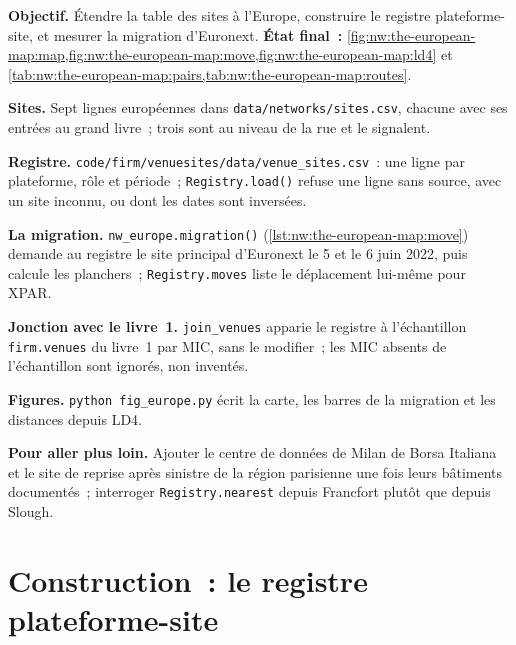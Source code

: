 \begin{tutorial}
\textbf{Objectif.} Étendre la table des sites à l'Europe, construire le registre plateforme-site, et mesurer la migration d'Euronext.
\textbf{État final~:} \cref{fig:nw:the-european-map:map,fig:nw:the-european-map:move,fig:nw:the-european-map:ld4} et
\cref{tab:nw:the-european-map:pairs,tab:nw:the-european-map:routes}.
\begin{tutsteps}
\item \textbf{Sites.} Sept lignes européennes dans \texttt{data/networks/sites.csv}, chacune avec ses entrées au grand livre~; trois sont au niveau de la rue et le signalent.
\item \textbf{Registre.} \texttt{code/firm/venuesites/data/venue\_sites.csv}~: une ligne par plateforme, rôle et période~;
  \texttt{Registry.load()} refuse une ligne sans source, avec un site inconnu, ou dont les dates sont inversées.
\item \textbf{La migration.} \texttt{nw\_europe.migration()} (\cref{lst:nw:the-european-map:move}) demande au registre le site principal d'Euronext
  le 5 et le 6 juin 2022, puis calcule les planchers~; \texttt{Registry.moves} liste le déplacement lui-même pour XPAR.
\item \textbf{Jonction avec le livre~1.} \texttt{join\_venues} apparie le registre à l'échantillon \texttt{firm.venues} du livre~1 par MIC, sans
  le modifier~; les MIC absents de l'échantillon sont ignorés, non inventés.
\item \textbf{Figures.} \texttt{python fig\_europe.py} écrit la carte, les barres de la migration et les distances depuis LD4.
\end{tutsteps}
\textbf{Pour aller plus loin.} Ajouter le centre de données de Milan de Borsa Italiana et le site de reprise après sinistre de la région parisienne une fois leurs bâtiments
documentés~; interroger \texttt{Registry.nearest} depuis Francfort plutôt que depuis Slough.
\end{tutorial}

\section{Construction~: le registre plateforme-site}\label{bld:nw:the-european-map:venuesites}


